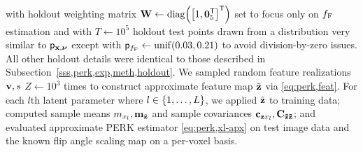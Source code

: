with holdout weighting matrix 
$\bmW \gets \diag{\brac{1, \zeros{5}\tpose}\tpose}$ 
set to focus only on $f_{\mathrm{F}}$ estimation
and with $T \gets 10^5$ holdout test points
drawn from a distribution 
very similar to $\mathsf{p}_{\mathbf{x},\boldsymbol{\nu}}$
except with $\dist{\ff} \gets \unif{0.03,0.21}$
to avoid division-by-zero issues.
All other holdout details
were identical to those
described in Subsection~\ref{sss,perk,exp,meth,holdout}.
We sampled random feature realizations $\mathbf{v},s$ 
$Z \gets 10^3$ times
to construct approximate feature map $\tilde{\mathbf{z}}$ 
via \eqref{eq:perk,feat}.
For each $l$th latent parameter where $l \in \set{1,\dots,L}$,
we applied $\tilde{\mathbf{z}}$ to training data;
computed sample means $m_{x_l},\mathbf{m}_{\tilde{\mathbf{z}}}$
and sample covariances $\mathbf{c}_{\mathbf{z} x_l},\mathbf{C_{\tilde{\mathbf{z}}\tilde{\mathbf{z}}}}$;
and evaluated approximate PERK estimator \eqref{eq:perk,xl-apx}
on test image data
and the known flip angle scaling map
on a per-voxel basis.

